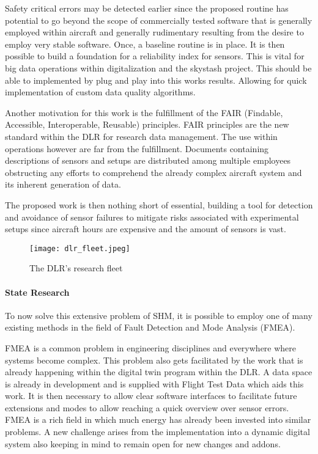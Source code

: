 Safety critical errors may be detected earlier since the proposed routine has potential to go beyond the scope of commercially tested software that is generally employed within aircraft and generally rudimentary resulting from the desire to employ very stable software.
Once, a baseline routine is in place. It is then possible to build a foundation for a reliability index for sensors. This is vital for big data operations within digitalization and the skystash project. This should be able to implemented by plug and play into this works results. Allowing for quick implementation of custom data quality algorithms.

Another motivation for this work is the fulfillment of the FAIR (Findable, Accessible, Interoperable, Reusable) principles. FAIR principles are the new standard within the DLR for research data management. The use within operations however are far from the fulfillment. Documents containing descriptions of sensors and setups are distributed among multiple employees obstructing any efforts to comprehend the already complex aircraft system and its inherent generation of data.

The proposed work is then nothing short of essential, building a tool for detection and avoidance of sensor failures to mitigate risks associated with experimental setups since aircraft hours are expensive and the amount of sensors is vast.

\begin{figure}
    \centering
    \texttt{[image: dlr\_fleet.jpeg]}
    \caption{The DLR's research fleet \cite{dlr_dlr-fleet_2018}}
    \label{fig:dlr_fleet}
\end{figure}



\paragraph{State Research}
To now solve this extensive problem of SHM, it is possible to employ one of many existing methods in the field of Fault Detection and Mode Analysis (FMEA).

FMEA is a common problem in engineering disciplines and everywhere where systems become complex. %
This problem also gets facilitated by the work that is already happening within the digital twin program within the DLR. A data space is already in development and is supplied with Flight Test Data which aids this work.
It is then necessary to allow clear software interfaces to facilitate future extensions and modes to allow reaching a quick overview over sensor errors.
FMEA is a rich field in which much energy has already been invested into similar problems. A new challenge arises from the implementation into a dynamic digital system also keeping in mind to remain open for new changes and addons.

